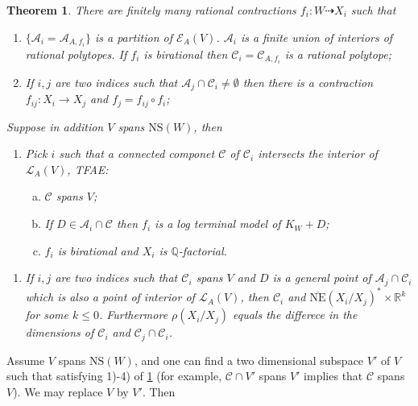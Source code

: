 \documentclass{article}
\newtheorem{thm}[defn]{Theorem}
\begin{document}
\begin{thm}\label{finite ample models}
There are finitely many rational contractions $ f_i:W\dashrightarrow X_i $ such that
\begin{enumerate}[1)]
\item $ \{\mathcal{A}_i=\mathcal{A}_{A,f_i}\} $ is a partition of $ \mathcal{E}_{A}(V) $. $ \mathcal{A}_i $ is a finite union of interiors of rational polytopes. If $ f_i $ is birational then $ \mathcal{C}_i=\mathcal{C}_{A,f_i} $ is a rational polytope;
\item If $ i,j $ are two indices such that $ \mathcal{A}_j\cap \mathcal{C}_i\neq \emptyset $ then there is a contraction $ f_{ij}:X_i\to X_j $ and $ f_j=f_{ij}\circ f_i $;
\end{enumerate}
Suppose in addition $ V $ spans $ \mathrm{NS}(W) $, then
\begin{enumerate}[3)]
\item Pick $ i $ such that a connected componet $ \mathcal{C} $ of $ \mathcal{C}_i $ intersects the interior of $ \mathcal{L}_A(V) $, TFAE:
\begin{enumerate}[a)]
\item $ \mathcal{C} $ spans $ V $;
\item If $ D\in \mathcal{A}_i\cap \mathcal{C} $ then $ f_i $ is a log terminal model of $ K_W+D $;
\item $ f_i $ is birational and $ X_i $ is $ \mathbb{Q} $-factorial.
\end{enumerate}
\end{enumerate}
\begin{enumerate}[4)]
\item If $ i,j $ are two indices such that $ \mathcal{C}_i $ spans $ V $ and $ D $ is a general point of $ \mathcal{A}_j\cap \mathcal{C}_i $ which is also a point of interior of $ \mathcal{L}_A(V) $, then $ \mathcal{C}_i $ and $ \overline{\mathrm{NE}}(X_i/X_j)^*\times \mathbb{R}^k $ for some $ k\leqslant 0 $. Furthermore $ \rho(X_i/X_j) $ equals the differece in the dimensions of $ \mathcal{C}_i $ and $ \mathcal{C}_j\cap \mathcal{C}_i $.
\end{enumerate}
\end{thm}
Assume $ V $ spans $ \mathrm{NS}(W) $, and one can find a two dimensional subspace $ V' $ of $ V $ such that satisfying 1)-4) of \ref{finite ample models} (for example, $ \mathcal{C}\cap V' $ spans $ V' $ implies that $ \mathcal{C} $ spans $ V $). We may replace $ V $ by $ V' $. Then
\end{document}
